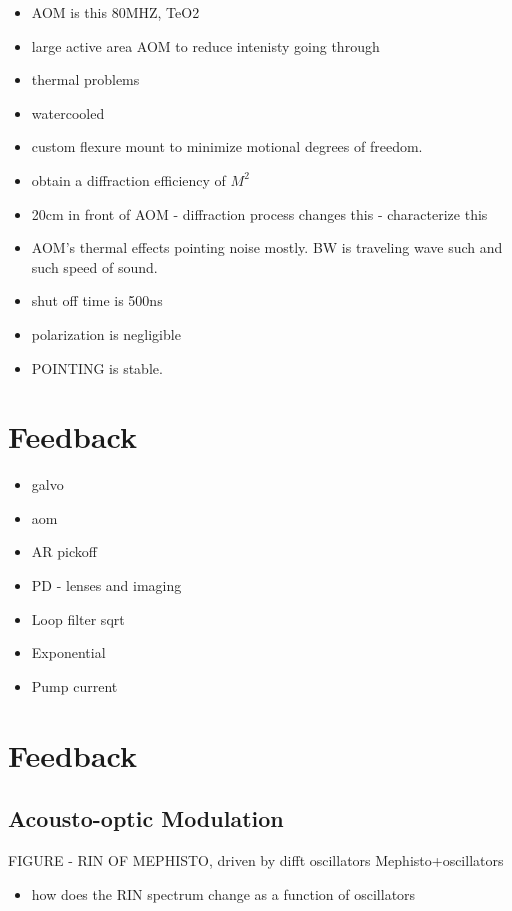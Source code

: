 \documentclass[twocolumn,aps,pra,showpacs,preprintnumbers,bibnotes]{revtex4-1}
\begin{document}
\begin{itemize}
    \item AOM is this 80MHZ, TeO2
    \item large active area AOM to reduce intenisty going through
    \item thermal problems
    \item watercooled
    \item custom flexure mount to minimize motional degrees of freedom.
    \item obtain a diffraction efficiency of $M^2$
    \item 20cm in front of AOM - diffraction process changes this - characterize this
    \item AOM's thermal effects pointing noise mostly. BW is traveling wave such and such speed of sound.
    \item shut off time is 500ns
    \item polarization is negligible
    \item POINTING is stable.
\end{itemize}

\section{Feedback}
\begin{itemize}
    \item galvo
    \item aom
    \item AR pickoff
    \item PD - lenses and imaging
    \item Loop filter sqrt
    \item Exponential
    \item Pump current
\end{itemize}



\section{Feedback}


\subsection{Acousto-optic Modulation}

FIGURE - RIN OF MEPHISTO, driven by difft oscillators
Mephisto+oscillators
\begin{itemize}
	\item how does the RIN spectrum change as a function of oscillators
\end{itemize}
\end{document}
